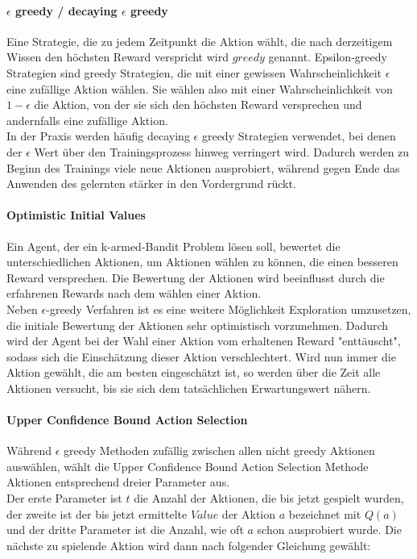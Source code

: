 \documentclass[11pt]{scrartcl}
\begin{document}
\paragraph{$\epsilon$ greedy / decaying $\epsilon$ greedy}
Eine Strategie, die zu jedem Zeitpunkt die Aktion wählt, die nach derzeitigem Wissen den
höchsten Reward verspricht wird $greedy$ genannt. Epsilon-greedy Strategien sind greedy
Strategien, die mit einer gewissen Wahrscheinlichkeit $\epsilon$ eine zufällige Aktion
wählen. Sie wählen also mit einer Wahrscheinlichkeit von $1 - \epsilon$ die Aktion, von
der sie sich den höchsten Reward versprechen und andernfalls eine zufällige Aktion.\\
In der Praxis werden häufig decaying $\epsilon$ greedy Strategien verwendet, bei denen der
$\epsilon$ Wert über den Trainingsprozess hinweg verringert wird. Dadurch werden zu Beginn
des Trainings viele neue Aktionen ausprobiert, während gegen Ende das Anwenden des
gelernten stärker in den Vordergrund rückt.

\paragraph{Optimistic Initial Values}
Ein Agent, der ein k-armed-Bandit Problem lösen soll, bewertet die unterschiedlichen
Aktionen, um Aktionen wählen zu können, die einen besseren Reward versprechen. Die
Bewertung der Aktionen wird beeinflusst durch die erfahrenen Rewards nach dem wählen einer
Aktion.\\
Neben $\epsilon$-greedy Verfahren ist es eine weitere Möglichkeit Exploration umzusetzen,
die initiale Bewertung der Aktionen sehr optimistisch vorzunehmen. Dadurch wird der Agent
bei der Wahl einer Aktion vom erhaltenen Reward "enttäuscht", sodass sich die Einschätzung
dieser Aktion verschlechtert. Wird nun immer die Aktion gewählt, die am besten
eingeschätzt ist, so werden über die Zeit alle Aktionen versucht, bis sie sich dem
tatsächlichen Erwartungswert nähern.

\paragraph{Upper Confidence Bound Action Selection}
Während $\epsilon$ greedy Methoden zufällig zwischen allen nicht greedy Aktionen
auswählen, wählt die Upper Confidence Bound Ac\-tion Selection Methode Aktionen entsprechend
dreier Parameter aus.\\
Der erste Parameter ist $t$ die Anzahl der Aktionen, die bis jetzt gespielt wurden, der
zweite ist der bis jetzt ermittelte $Value$ der Aktion $a$ bezeichnet mit $Q(a)$ und der
dritte Parameter ist die Anzahl, wie oft $a$ schon ausprobiert wurde. Die nächste zu
spielende Aktion wird dann nach folgender Gleichung gewählt:
\end{document}
